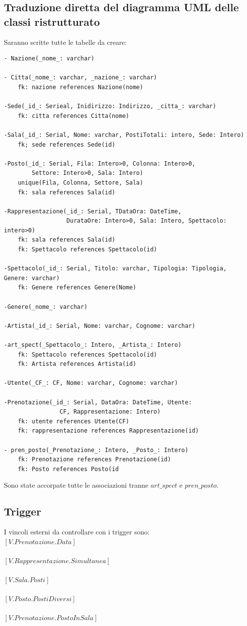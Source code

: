 \documentclass[12pt, letterpaper]{article}
\newcommand{\acc}{\\\hphantom{}\\}
\begin{document}
\subsection{Traduzione diretta del diagramma UML delle classi ristrutturato}
Saranno scritte tutte le tabelle da creare:
\begin{verbatim}
- Nazione(_nome_: varchar)

- Citta(_nome_: varchar, _nazione_: varchar)
    fk: nazione references Nazione(nome)

-Sede(_id_: Serieal, Inidirizzo: Indirizzo, _citta_: varchar)
    fk: citta references Citta(nome)

-Sala(_id_: Serial, Nome: varchar, PostiTotali: intero, Sede: Intero)
    fk; sede references Sede(id)

-Posto(_id_: Serial, Fila: Intero>0, Colonna: Intero>0, 
        Settore: Intero>0, Sala: Intero)
    unique(Fila, Colonna, Settore, Sala)
    fk: sala references Sala(id)

-Rappresentazione(_id_: Serial, TDataOra: DateTime, 
                  DurataOre: Intero>0, Sala: Intero, Spettacolo: intero>0)
    fk: sala references Sala(id)
    fk: Spettacolo references Spettacolo(id)

-Spettacolo(_id_: Serial, Titolo: varchar, Tipologia: Tipologia, Genere: varchar)
    fk: Genere references Genere(Nome)

-Genere(_nome_: varchar)

-Artista(_id_: Serial, Nome: varchar, Cognome: varchar)

-art_spect(_Spettacolo_: Intero, _Artista_: Intero)
    fk: Spettacolo references Spettacolo(id)
    fk: Artista references Artista(id)

-Utente(_CF_: CF, Nome: varchar, Cognome: varchar)

-Prenotazione(_id_: Serial, DataOra: DateTime, Utente: 
                CF, Rappresentazione: Intero)
    fk: utente references Utente(CF)
    fk: rappresentazione references Rappresentazione(id)

- pren_posto(_Prenotazione_: Intero, _Posto_: Intero)
    fk: Prenotazione references Prenotazione(id)
    fk: Posto references Posto(id
\end{verbatim}
Sono state accorpate tutte le associazioni tranne $art\_spect$ e $pren\_posto$.
\newpage \subsection{Trigger}
I vincoli esterni da controllare con i trigger sono:\\
$[V.Prenotazione.Data]$ \acc
$[V.Rappresentazione.Simultanea]$ \acc 
$[V.Sala.Posti]$ \acc
$[V.Posto.PostiDiversi]$\acc 
$[V.Prenotazione.PostoInSala]$
\end{document}
